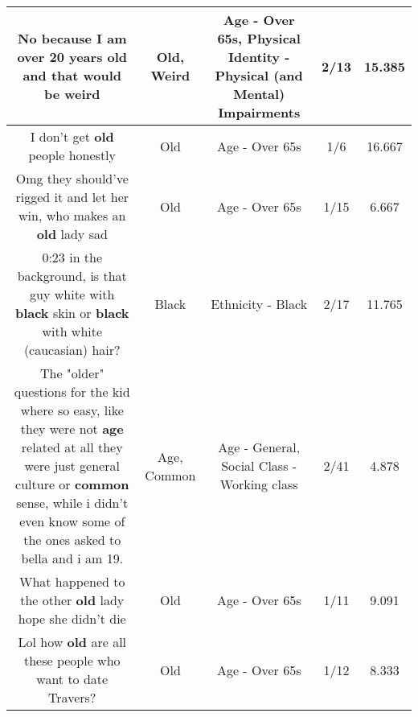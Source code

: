 \documentclass[11pt]{article}
\newlength\mylength
\begin{document}
\begin{center}
\begin{longtable}{|C{.65\mylength}|C{.30\mylength}|C{.12\mylength}|C{.12\mylength}|C{.12\mylength}|}
  \small No because I am over 20 years \textbf{old} and that would be weird\normalsize   & Old, Weird & Age - Over 65s, Physical Identity - Physical (and Mental) Impairments & 2/13 & 15.385 \\  \hline
  \small I don't get \textbf{old} people honestly\normalsize   & Old & Age - Over 65s & 1/6 & 16.667 \\  \hline
  \small Omg they should've rigged it and let her win, who makes an \textbf{old} lady sad\normalsize   & Old & Age - Over 65s & 1/15 & 6.667 \\  \hline
  \small 0:23 in the background, is that guy white with \textbf{black} skin or \textbf{black} with white (caucasian) hair?\normalsize   & Black & Ethnicity - Black & 2/17 & 11.765 \\  \hline
  \small The "older" questions for the kid where so easy, like they were not \textbf{age} related at all they were just general culture or \textbf{common} sense, while i didn't even know some of the ones asked to bella and i am 19.\normalsize   & Age, Common & Age - General, Social Class - Working class & 2/41 & 4.878 \\  \hline
  \small What happened to the other \textbf{old} lady hope she didn't die\normalsize   & Old & Age - Over 65s & 1/11 & 9.091 \\  \hline
  \small Lol how \textbf{old} are all these people who want to date Travers?\normalsize   & Old & Age - Over 65s & 1/12 & 8.333 \\  \hline

\end{longtable}
\end{center}
\end{document}
